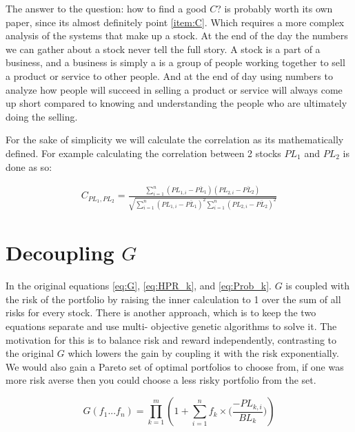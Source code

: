\documentclass[11pt]{article}
\begin{document}
    The answer to the question: how to find a good \(C\)? is probably worth its own paper, since
    its almost definitely point \ref{item:C}. Which requires a more complex analysis of the systems
    that make up a stock. At the end of the day the numbers we can gather about a stock never
    tell the full story. A stock is a part of a business, and a business is simply a is a
    group of people working together to sell a product or service to other people.
    And at the end of day using numbers to analyze how people will succeed in selling
    a product or service will always come up short compared to knowing and understanding
    the people who are ultimately doing the selling.

    For the sake of simplicity we will calculate the correlation as its mathematically defined.
    For example calculating the correlation between 2 stocks \(PL_1\) and \(PL_2\) is
    done as so:

    \begin{align}
        C_{PL_1, PL_2} = 
        \frac{
            \displaystyle\sum^{n}_{i=1} (PL_{1, i} - \bar {PL_1})(PL_{2, i} - \bar {PL_2})
        }{
            \sqrt{
                \displaystyle\sum^{n}_{i=1}(PL_{1,i} - \bar {PL_1})^2 
                \displaystyle\sum^{n}_{i=1}(PL_{2,i} - \bar {PL_2})^2
            }
        }
        \label{eq:Correlation}
    \end{align}

\section{Decoupling \(G\)}

    In the original equations \ref{eq:G}, \ref{eq:HPR_k}, and \ref{eq:Prob_k}.
    \(G\) is coupled with the risk of the portfolio
    by raising the inner calculation to 1 over the sum of all risks for every stock.
    There is another approach, which is to keep the two equations separate and use multi-
    objective genetic algorithms to solve it. The motivation for this is to balance risk
    and reward independently, contrasting to the original \(G\) which lowers the gain
    by coupling it with the risk exponentially. We would also gain a Pareto set of
    optimal portfolios to choose from, if one was more risk averse then you could choose
    a less risky portfolio from the set.

    \begin{equation}\label{eq:DecoupleG}
        G(f_1...f_n) = \displaystyle\prod^{m}_{k=1} \left(
                1 + \displaystyle\sum^{n}_{i=1} f_k \times \Big(
                    \frac{- PL_{k,i} }{BL_k}
                \Big)
            \right)
    \end{equation}
\end{document}
